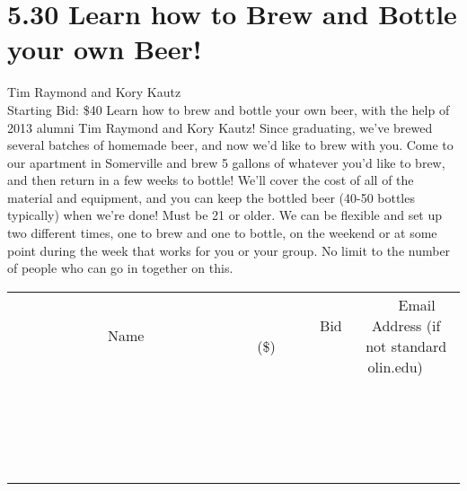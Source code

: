 \documentclass[11pt]{article}
\begin{document}
\section*{5.30 Learn how to Brew and Bottle your own Beer!}
Tim Raymond and Kory Kautz
\\
Starting Bid: \$40
\newline
Learn how to brew and bottle your own beer, with the help of 2013 alumni Tim Raymond and Kory Kautz!  Since graduating, we've brewed several batches of homemade beer, and now we'd like to brew with you.  Come to our apartment in Somerville and brew 5 gallons of whatever you'd like to brew, and then return in a few weeks to bottle!  We'll cover the cost of all of the material and equipment, and you can keep the bottled beer (40-50 bottles typically) when we're done!  Must be 21 or older.  We can be flexible and set up two different times, one to brew and one to bottle, on the weekend or at some point during the week that works for you or your group.  No limit to the number of people who can go in together on this.
\\[3ex]
\begin{tabular}{c c c}
~~~~~~~~~~~~~Name~~~~~~~~~~~~~ & ~~~~~~~~~Bid (\$)~~~~~~~~~  & ~~~Email Address (if not standard olin.edu)~~~\\
 & & \\
\hline
 & & \\
\hline
 & & \\
\hline
 & & \\
\hline
 & & \\
\hline
 & & \\
\hline
 & & \\
\hline
 & & \\
\hline
 & & \\
\hline
 & & \\
\hline
 & & \\
\hline
 & & \\
\hline
 & & \\
\hline
 & & \\
\hline
 & & \\
\hline
 & & \\
\hline
 & & \\
\hline
 & & \\
\hline
 & & \\
\hline
\end{tabular}
\newpage
\end{document}
